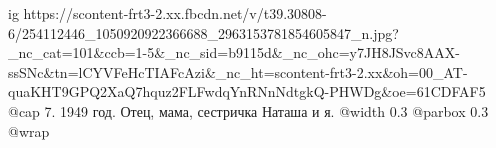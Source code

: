  
 
 
 
 

\ifcmt
  ig https://scontent-frt3-2.xx.fbcdn.net/v/t39.30808-6/254112446_1050920922366688_2963153781854605847_n.jpg?_nc_cat=101&ccb=1-5&_nc_sid=b9115d&_nc_ohc=y7JH8JSvc8AAX-ssSNc&tn=lCYVFeHcTIAFcAzi&_nc_ht=scontent-frt3-2.xx&oh=00_AT-quaKHT9GPQ2XaQ7hquz2FLFwdqYnRNnNdtgkQ-PHWDg&oe=61CDFAF5
  @cap 7. 1949 год. Отец, мама, сестричка Наташа и я.
  @width 0.3
  @parbox 0.3
  @wrap \parpic[l]
\fi
